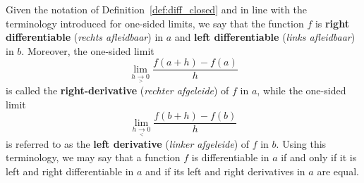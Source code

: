 Given the notation of Definition~\ref{def:diff_closed} and in line with the terminology introduced for one-sided limits, we say that the function $f$ is \textbf{right differentiable} (\textit{rechts afleidbaar}) in $a$ and  \textbf{left differentiable} (\textit{links afleidbaar}) in $b$. Moreover, the one-sided limit 
$$\lim_{h\underset{>}{\rightarrow}0}\frac{f(a+h)-f(a)}{h}$$
is called the \textbf{right-derivative} (\textit{rechter afgeleide})  of $f$ in $a$, while the one-sided limit
$$\lim_{h\underset{<}{\rightarrow}0}\frac{f(b+h)-f(b)}{h}$$
is referred to as the \textbf{left derivative} (\textit{linker afgeleide})  of $f$ in $b$.
 Using this terminology, we may say that a function $f$ is differentiable in $a$ if and only if it is left and right differentiable in $a$ and if its left and right derivatives in $a$ are equal.  

